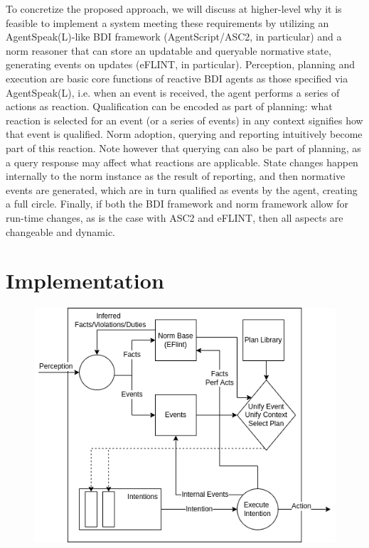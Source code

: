 
To concretize the proposed approach, we will discuss at higher-level why it is feasible to implement a system meeting these requirements by utilizing an AgentSpeak(L)-like BDI framework (AgentScript/ASC2, in particular) and a norm reasoner that can store an updatable and queryable normative state, generating events on updates (eFLINT, in particular). Perception, planning and execution are basic core functions of reactive BDI agents as those specified via AgentSpeak(L), i.e. when an event is received, the agent performs a series of actions as reaction. Qualification can be encoded as part of planning: what reaction is selected for an event (or a series of events) in any context signifies how that event is qualified. Norm adoption, querying and reporting intuitively become part of this reaction. Note however that querying can also be part of planning, as a query response may affect what reactions are applicable. State changes happen internally to the norm instance as the result of reporting, and then normative events are generated, which are in turn qualified as events by the agent, creating a full circle. Finally, if both the BDI framework and norm framework allow for run-time changes, as is the case with ASC2 and eFLINT, then all aspects are changeable and dynamic. 
%

\section{Implementation}
\label{sec:impl}
\label{sec:implementation}
\begin{figure}[t]
\centering
\begin{minipage}[b]{.7\linewidth}
  \centering
  \includegraphics[width=\textwidth]{ch_eumas/nbdi.png}
  \label{fig:nbdi}
\end{minipage}
\end{figure}
%

